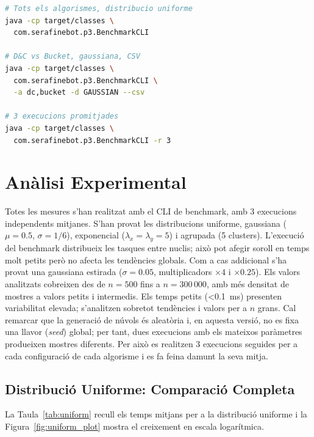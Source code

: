 \documentclass[conference,compsoc]{IEEEtran}
\begin{document}
\begin{lstlisting}[caption={Exemples d'ús del CLI.},label={lst:cli},language=bash]
# Tots els algorismes, distribucio uniforme
java -cp target/classes \
  com.serafinebot.p3.BenchmarkCLI

# D&C vs Bucket, gaussiana, CSV
java -cp target/classes \
  com.serafinebot.p3.BenchmarkCLI \
  -a dc,bucket -d GAUSSIAN --csv

# 3 execucions promitjades
java -cp target/classes \
  com.serafinebot.p3.BenchmarkCLI -r 3
\end{lstlisting}

\section{Anàlisi Experimental}
\label{sec:experimental}

Totes les mesures s'han realitzat amb el CLI de benchmark, amb
3 execucions independents mitjanes. S'han provat les distribucions uniforme, gaussiana
($\mu=0.5$, $\sigma=1/6$), exponencial ($\lambda_x=\lambda_y=5$) i
agrupada (5 clusters). L'execució del benchmark distribueix les tasques
entre nuclis; això pot afegir soroll en temps molt petits però no afecta
les tendències globals. Com a cas addicional s'ha provat una gaussiana
estirada ($\sigma=0.05$, multiplicadors $\times4$ i $\times0.25$).
Els valors analitzats cobreixen des de $n=500$ fins a $n=300\,000$,
amb més densitat de mostres a valors petits i intermedis.
Els temps petits (\textless 0.1~ms)
presenten variabilitat elevada; s'analitzen sobretot tendències i valors
per a $n$ grans.
Cal remarcar que la generació de núvols és aleatòria i, en aquesta versió,
no es fixa una llavor (\textit{seed}) global; per tant, dues execucions amb els mateixos paràmetres
produeixen mostres diferents. Per això es realitzen 3 execucions seguides per a cada configuració
de cada algorisme i es fa feina damunt la seva mitja.

\subsection{Distribució Uniforme: Comparació Completa}

La Taula~\ref{tab:uniform} recull els temps mitjans per a la distribució
uniforme i la Figura~\ref{fig:uniform_plot} mostra el creixement en escala
logarítmica.
\end{document}
